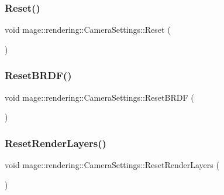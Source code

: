 \hypertarget{classmage_1_1rendering_1_1_camera_settings_aee82c8e6ad327e0a5bda4d3a56d69587}{}\label{classmage_1_1rendering_1_1_camera_settings_aee82c8e6ad327e0a5bda4d3a56d69587} 
\subsubsection{\texorpdfstring{Reset()}{Reset()}}
{\footnotesize\ttfamily void mage\+::rendering\+::\+Camera\+Settings\+::\+Reset (\begin{DoxyParamCaption}{ }\end{DoxyParamCaption})\hspace{0.3cm}{\ttfamily [noexcept]}}

\hypertarget{classmage_1_1rendering_1_1_camera_settings_a0f807e646ebdcd6514a89a087f476781}{}\label{classmage_1_1rendering_1_1_camera_settings_a0f807e646ebdcd6514a89a087f476781} 
\subsubsection{\texorpdfstring{Reset\+B\+R\+D\+F()}{ResetBRDF()}}
{\footnotesize\ttfamily void mage\+::rendering\+::\+Camera\+Settings\+::\+Reset\+B\+R\+DF (\begin{DoxyParamCaption}{ }\end{DoxyParamCaption})\hspace{0.3cm}{\ttfamily [noexcept]}}

\hypertarget{classmage_1_1rendering_1_1_camera_settings_a954a0af8d7939069e32b77abc23f95d0}{}\label{classmage_1_1rendering_1_1_camera_settings_a954a0af8d7939069e32b77abc23f95d0} 
\subsubsection{\texorpdfstring{Reset\+Render\+Layers()}{ResetRenderLayers()}}
{\footnotesize\ttfamily void mage\+::rendering\+::\+Camera\+Settings\+::\+Reset\+Render\+Layers (\begin{DoxyParamCaption}{ }\end{DoxyParamCaption})\hspace{0.3cm}{\ttfamily [noexcept]}}

